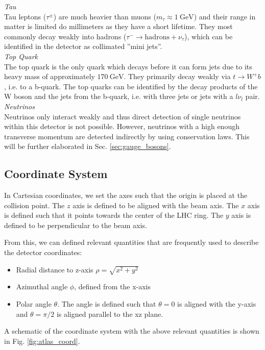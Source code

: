 \documentclass[a4paper]{report}
\numberwithin{equation}{section}
\begin{document}
\noindent \textit{Tau} \\

Tau leptons ($\tau^\pm$) are much heavier than muons ($m_\tau \approx \SI{1}{\giga\electronvolt}$) and their range in matter is limited do millimeters 
as they have a short lifetime. They most commonly decay weakly into hadrons ($\tau^- \rightarrow \mathrm{hadrons} + \nu_\tau$), which can be identified in the detector as collimated ''mini jets''. \\

\noindent \textit{Top Quark} \\

The top quark is the only quark which decays before it can form jets due to its heavy mass of approximately $\SI{170}{\giga\electronvolt}$. They 
primarily decay weakly via $t \rightarrow W^+ b$, i.e. to a b-quark. The top quarks can be identified by the decay products of the W boson and the 
jets from the b-quark, i.e. with three jets or jets with a $l\nu_l$ pair. \\

\noindent \textit{Neutrinos} \\

Neutrinos only interact weakly and thus direct detection of single neutrinos within this detector is not possible. However, neutrinos with a high enough 
transverse momentum are detected indirectly by using conservation laws. This will be further elaborated in Sec. \ref{sec:gauge_bosons}.

\subsection{Coordinate System} 

In Cartesian coordinates, we set the axes such that the origin is placed at the collision point. 
The $z$ axis is defined to be aligned with the beam axis. The $x$ axis is defined such that it 
points towards the center of the LHC ring. The $y$ axis is defined to be perpendicular to the beam axis. 
\par

From this, we can defined relevant quantities that are frequently used to describe the detector coordinates:
\begin{itemize}
	\item Radial distance to z-axis $\rho = \sqrt{x^2 + y^2}$ 
	\item Azimuthal angle $\phi$, defined from the x-axis 
	\item Polar angle $\theta$. The angle is defined such that $\theta = 0$ is aligned with the y-axis and $\theta = \pi / 2$ is 
			aligned parallel to the xz plane. 
\end{itemize}
A schematic of the coordinate system with the above relevant quantities is shown in Fig. \ref{fig:atlas_coord}.
\end{document}
